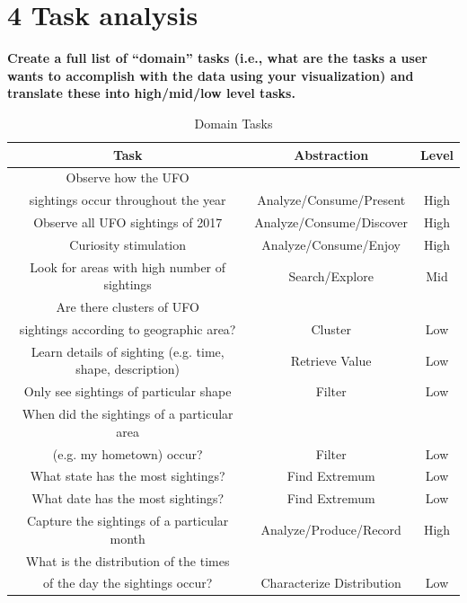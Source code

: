 \documentclass{neu_handout}
\begin{document}
\section*{4 Task analysis}

\textbf{Create a full list of “domain” tasks (i.e., what are the tasks a
user wants to accomplish with the data using your visualization) and translate these into high/mid/low level tasks.}

\begin{table}[h]
\caption{Domain Tasks} %
\centering %
\begin{tabular}{c c c} %
\hline\hline %
 Task & Abstraction & Level \\ [0.5ex]
\hline %

Observe how the UFO \\sightings occur throughout the year &
Analyze/Consume/Present &
High \\[1ex] %

Observe all UFO sightings of 2017 & 
Analyze/Consume/Discover & High \\[1ex] %

Curiosity stimulation &
Analyze/Consume/Enjoy &
High \\[1ex] %

Look for areas with high number of sightings &
Search/Explore &
Mid \\[1ex] %


Are there clusters of UFO\\ sightings according to geographic area? &
Cluster &
Low  \\[1ex] %

Learn details of sighting (e.g. time, shape, description) &
Retrieve Value &
Low \\[1ex] %

Only see sightings of particular shape &
Filter &
Low \\[1ex] %

When did the sightings of a particular area \\(e.g. my hometown) occur? &
Filter &
Low \\[1ex] %

What state has the most sightings? &
Find Extremum &
Low \\[1ex] %

What date has the most sightings? &
Find Extremum &
Low \\[1ex] %

Capture the sightings of a particular month &
Analyze/Produce/Record &
High \\[1ex] %

What is the distribution of the times\\ of the day the sightings occur? &
Characterize Distribution &
Low \\


\hline 
\end{tabular}
\label{tab:PPer}
\end{table}
\end{document}
